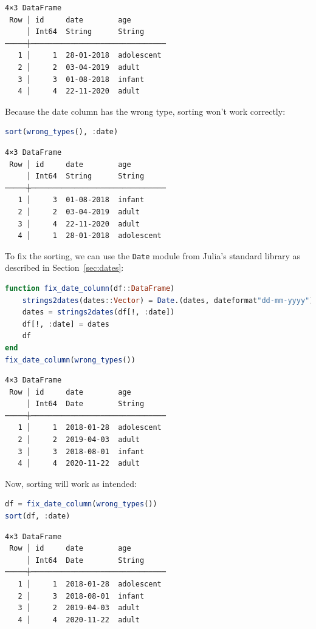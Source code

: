 \documentclass[
  notoc %
]{tufte-book}
\newcommand{\passthrough}[1]{#1}
\begin{document}
\begin{lstlisting}[language=Output]
4×3 DataFrame
 Row │ id     date        age
     │ Int64  String      String
─────┼───────────────────────────────
   1 │     1  28-01-2018  adolescent
   2 │     2  03-04-2019  adult
   3 │     3  01-08-2018  infant
   4 │     4  22-11-2020  adult
\end{lstlisting}

Because the date column has the wrong type, sorting won't work
correctly:

\begin{lstlisting}[language=Julia]
sort(wrong_types(), :date)
\end{lstlisting}

\begin{lstlisting}[language=Output]
4×3 DataFrame
 Row │ id     date        age
     │ Int64  String      String
─────┼───────────────────────────────
   1 │     3  01-08-2018  infant
   2 │     2  03-04-2019  adult
   3 │     4  22-11-2020  adult
   4 │     1  28-01-2018  adolescent
\end{lstlisting}

To fix the sorting, we can use the \passthrough{\lstinline!Date!} module
from Julia's standard library as described in Section~\ref{sec:dates}:

\begin{lstlisting}[language=Julia]
function fix_date_column(df::DataFrame)
    strings2dates(dates::Vector) = Date.(dates, dateformat"dd-mm-yyyy")
    dates = strings2dates(df[!, :date])
    df[!, :date] = dates
    df
end
fix_date_column(wrong_types())
\end{lstlisting}

\begin{lstlisting}[language=Output]
4×3 DataFrame
 Row │ id     date        age
     │ Int64  Date        String
─────┼───────────────────────────────
   1 │     1  2018-01-28  adolescent
   2 │     2  2019-04-03  adult
   3 │     3  2018-08-01  infant
   4 │     4  2020-11-22  adult
\end{lstlisting}

Now, sorting will work as intended:

\begin{lstlisting}[language=Julia]
df = fix_date_column(wrong_types())
sort(df, :date)
\end{lstlisting}

\begin{lstlisting}[language=Output]
4×3 DataFrame
 Row │ id     date        age
     │ Int64  Date        String
─────┼───────────────────────────────
   1 │     1  2018-01-28  adolescent
   2 │     3  2018-08-01  infant
   3 │     2  2019-04-03  adult
   4 │     4  2020-11-22  adult
\end{lstlisting}
\end{document}
